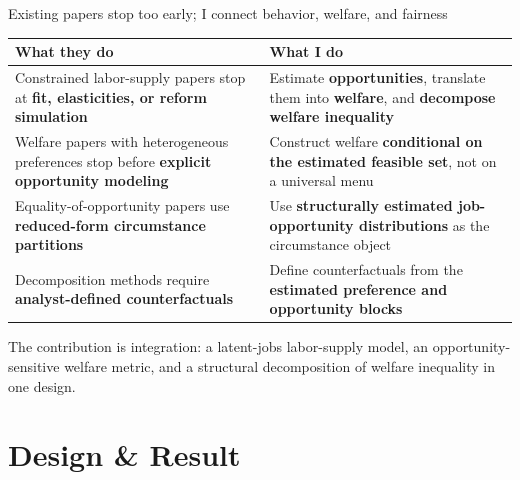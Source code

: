 \documentclass[aspectratio=169,11pt]{beamer}
\begin{document}
\begin{frame}{Existing papers stop too early; I connect behavior, welfare, and fairness}

\footnotesize
\begin{tabular}{@{}>{\raggedright\arraybackslash}p{5.2cm} >{\raggedright\arraybackslash}p{5.2cm}@{}}
\toprule
\textbf{What they do} & \textbf{What I do} \\
\midrule
Constrained labor-supply papers stop at \textbf{fit, elasticities, or reform simulation}
& Estimate \textbf{opportunities}, translate them into \textbf{welfare}, and \textbf{decompose welfare inequality} \\[6pt]
Welfare papers with heterogeneous preferences stop before \textbf{explicit opportunity modeling}
& Construct welfare \textbf{conditional on the estimated feasible set}, not on a universal menu \\[6pt]
Equality-of-opportunity papers use \textbf{reduced-form circumstance partitions}
& Use \textbf{structurally estimated job-opportunity distributions} as the circumstance object \\[6pt]
Decomposition methods require \textbf{analyst-defined counterfactuals}
& Define counterfactuals from the \textbf{estimated preference and opportunity blocks} \\
\bottomrule
\end{tabular}

\vfill
\scriptsize\textcolor{cgrey}{The contribution is integration: a latent-jobs labor-supply model, an opportunity-sensitive welfare metric, and a structural decomposition of welfare inequality in one design.}
\end{frame}

\section{Design \& Result}
\end{document}

